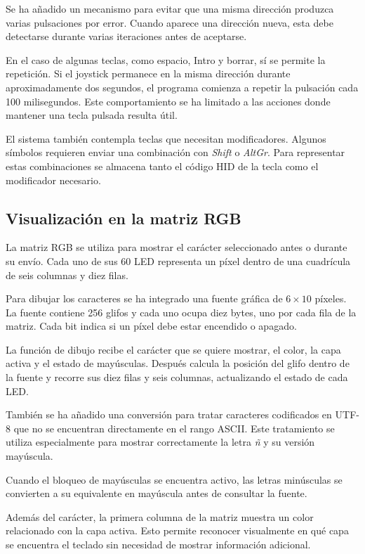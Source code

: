 Se ha añadido un mecanismo para evitar que una misma dirección produzca varias pulsaciones por error. Cuando aparece una dirección nueva, esta debe detectarse durante varias iteraciones antes de aceptarse.

En el caso de algunas teclas, como espacio, Intro y borrar, sí se permite la repetición. Si el joystick permanece en la misma dirección durante aproximadamente dos segundos, el programa comienza a repetir la pulsación cada 100 milisegundos. Este comportamiento se ha limitado a las acciones donde mantener una tecla pulsada resulta útil.

El sistema también contempla teclas que necesitan modificadores. Algunos símbolos requieren enviar una combinación con \textit{Shift} o \textit{AltGr}. Para representar estas combinaciones se almacena tanto el código HID de la tecla como el modificador necesario.

\subsection{Visualización en la matriz RGB}
\label{subsec:implementacion-matriz}

La matriz RGB se utiliza para mostrar el carácter seleccionado antes o durante su envío. Cada uno de sus 60 LED representa un píxel dentro de una cuadrícula de seis columnas y diez filas.

Para dibujar los caracteres se ha integrado una fuente gráfica de \(6 \times 10\) píxeles. La fuente contiene 256 glifos y cada uno ocupa diez bytes, uno por cada fila de la matriz. Cada bit indica si un píxel debe estar encendido o apagado.

La función de dibujo recibe el carácter que se quiere mostrar, el color, la capa activa y el estado de mayúsculas. Después calcula la posición del glifo dentro de la fuente y recorre sus diez filas y seis columnas, actualizando el estado de cada LED.

También se ha añadido una conversión para tratar caracteres codificados en UTF-8 que no se encuentran directamente en el rango ASCII. Este tratamiento se utiliza especialmente para mostrar correctamente la letra \textit{ñ} y su versión mayúscula.

Cuando el bloqueo de mayúsculas se encuentra activo, las letras minúsculas se convierten a su equivalente en mayúscula antes de consultar la fuente.

Además del carácter, la primera columna de la matriz muestra un color relacionado con la capa activa. Esto permite reconocer visualmente en qué capa se encuentra el teclado sin necesidad de mostrar información adicional.

